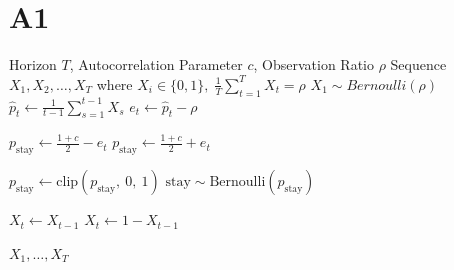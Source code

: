 \documentclass{article}
\begin{document}
\section{A1}

\begin{algorithm}
    \caption{Generate Adversarial Sequence}
    \begin{algorithmic}[1]
        \Require Horizon $T$, Autocorrelation Parameter $c$, Observation Ratio $\rho$
        \Ensure Sequence $X_1, X_2, \ldots , X_T$ where $X_i \in \{0, 1\}, \;\frac{1}{T}\sum_{t=1}^T X_t = \rho$
        \State $X_1 \sim Bernoulli(\rho)$
            \State $\hat{p}_t \gets \frac{1}{t-1} \sum_{s=1}^{t-1} X_s$ 
            \State $e_t \gets \hat{p}_t - \rho$ 

                \State $p_{\text{stay}} \gets \frac{1+c}{2} - e_t$
            \Else
                \State $p_{\text{stay}} \gets \frac{1+c}{2} + e_t$
            \EndIf

            \State $p_{\text{stay}} \gets \text{clip}(p_{\text{stay}},\ 0,\ 1)$
            \State $\text{stay} \sim \text{Bernoulli}(p_{\text{stay}})$

                \State $X_t \gets X_{t-1}$
            \Else
                \State $X_t \gets 1 - X_{t-1}$
            \EndIf
        \EndFor

        \State \Return $X_1, \dots, X_T$

    \end{algorithmic}
\end{algorithm}
\end{document}
